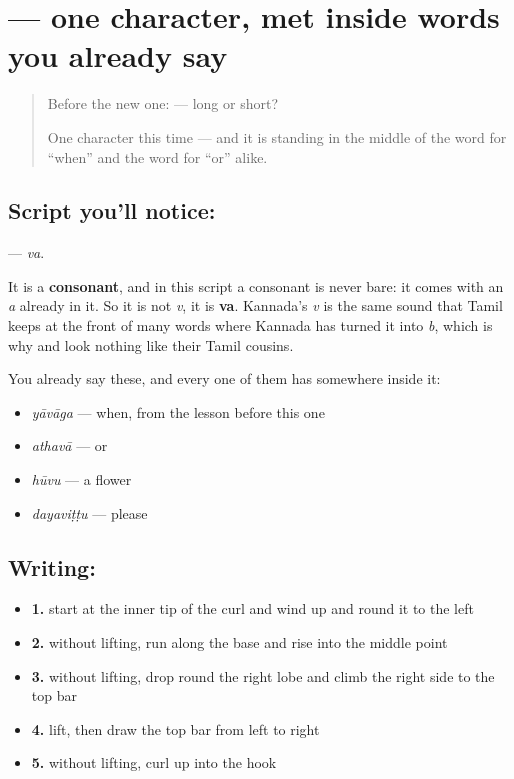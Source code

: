 \section[\texorpdfstring{\kn{ವ} (va)}{ವ (va)}]{ — one character, met inside words you already say}

\label{lesson:KA-S139-letter-va}



\begin{quote}
Before the new one:  — long or short?

One character this time — and it is standing in the middle of the word for \textquotedblleft{}when\textquotedblright{} and the word for \textquotedblleft{}or\textquotedblright{} alike.
\end{quote}

\subsection*{Script you'll notice: }
\textbf{} — \emph{va}.

It is a \textbf{consonant}, and in this script a consonant is never bare: it comes with an \emph{a} already in it. So it is not \emph{v}, it is \textbf{va}. Kannada's \emph{v} is the same sound that Tamil keeps at the front of many words where Kannada has turned it into \emph{b}, which is why  and  look nothing like their Tamil cousins.

You already say these, and every one of them has  somewhere inside it:

\begin{itemize}
\raggedright
  \item \textbf{} \emph{yāvāga} — when, from the lesson before this one
  \item \textbf{} \emph{athavā} — or
  \item \textbf{} \emph{hūvu} — a flower
  \item \textbf{} \emph{dayaviṭṭu} — please
\end{itemize}

\subsection*{Writing: }

\begin{itemize}
\raggedright
  \item \textbf{1.} start at the inner tip of the curl and wind up and round it to the left
  \item \textbf{2.} without lifting, run along the base and rise into the middle point
  \item \textbf{3.} without lifting, drop round the right lobe and climb the right side to the top bar
  \item \textbf{4.} lift, then draw the top bar from left to right
  \item \textbf{5.} without lifting, curl up into the hook
\end{itemize}

